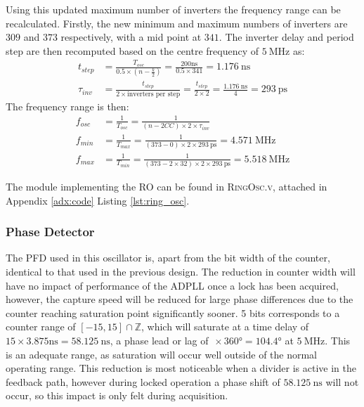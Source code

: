 Using this updated maximum number of inverters the frequency range can be recalculated. Firstly, the new minimum and maximum numbers of inverters are $309$ and $373$ respectively, with a mid point at $341$. The inverter delay and period step are then recomputed based on the centre frequency of $5~\si{\mega\hertz}$ as:
\begin{align}%
t_{step} &= \frac{T_{osc}}{0.5\times(n-\frac{k}{2})} = \frac{200\si{\nano\second}}{0.5\times 341} = 1.176~\si{\nano\second} \\
\tau_{inv} &= \frac{t_{step}}{2\times\text{inverters per step}} = \frac{t_{step}}{2\times2} = \frac{1.176~\si{\nano\second}}{4} = 293~\si{\pico\second}
\end{align}
The frequency range is then:
\begin{align} %
f_{osc} &= \frac{1}{T_{osc}} = \frac{1}{(n-2CC)\times 2\times\tau_{inv}} \\
f_{min} &= \frac{1}{T_{max}} = \frac{1}{(373-0)\times 2\times 293~\si{\pico\second}} = 4.571~\si{\mega\hertz} \\
f_{max} &= \frac{1}{T_{min}} = \frac{1}{(373-2\times32)\times 2\times 293~\si{\pico\second}} = 5.518~\si{\mega\hertz}
\end{align}

The module implementing the \ac{RO} can be found in \textsc{RingOsc.v}, attached in Appendix \ref{adx:code} Listing \ref{lst:ring_osc}.

\subsubsection{Phase Detector}
The \ac{PFD} used in this oscillator is, apart from the bit width of the counter, identical to that used in the previous design. The reduction in counter width will have no impact of performance of the \ac{ADPLL} once a lock has been acquired, however, the capture speed will be reduced for large phase differences due to the counter reaching saturation point significantly sooner. 5 bits corresponds to a counter range of $[-15,15]\cap\mathbb{Z}$, which will saturate at a time delay of $15\times3.875\si{\nano\second} = 58.125~\si{\nano\second}$, a phase lead or lag of $\frac{}{}\times360\si{\degree} = 104.4\si{\degree}$ at $5~\si{\mega\hertz}$. This is an adequate range, as saturation will occur well outside of the normal operating range. This reduction is most noticeable when a divider is active in the feedback path, however during locked operation a phase shift of $58.125~\si{\nano\second}$ will not occur, so this impact is only felt during acquisition.

